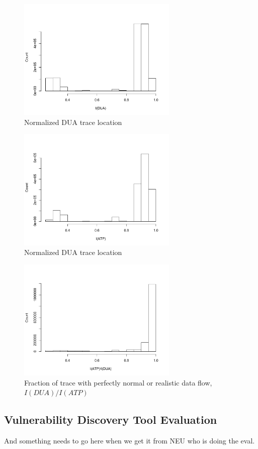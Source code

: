 \begin{figure}
\centering
\includegraphics[width=3in]{dua.pdf}
\caption{Normalized DUA trace location}
\label{fig:dua-hist}
\end{figure}

\begin{figure}
\centering
\includegraphics[width=3in]{atp.pdf}
\caption{Normalized DUA trace location}
\label{fig:atp-hist}
\end{figure}

\begin{figure}
\centering
\includegraphics[width=3in]{rdf.pdf}
\caption{Fraction of trace with perfectly normal or realistic data flow, $I(DUA)/I(ATP)$}
\label{fig:rdf-hist}
\end{figure}


\subsection{Vulnerability Discovery Tool Evaluation}

And something needs to go here when we get it from NEU who is doing the eval.




